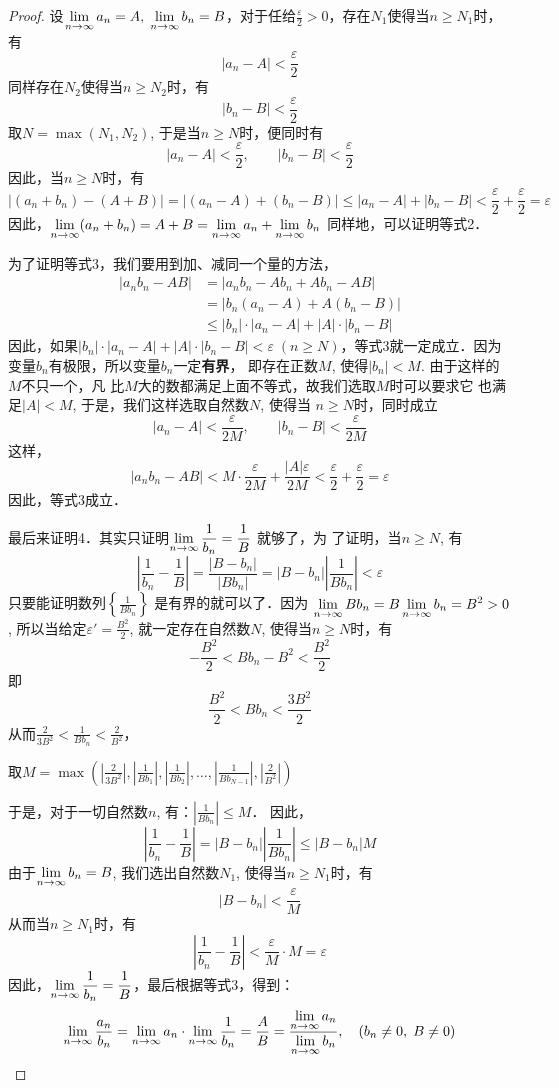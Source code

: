 \begin{proof}
    设$\displaystyle\lim_{n\to\infty}a_n=A,\; \displaystyle\lim_{n\to\infty}b_n=B$，对于任给$\frac{\varepsilon}{2}>0$，存在$N_1$使得当$n\ge N_1$时，有
\[|a_n-A|<\frac{\varepsilon}{2}\]
    同样存在$N_2$使得当$n\ge N_2$时，有
    \[|b_n-B|<\frac{\varepsilon}{2}\]
    取$N=\max(N_1,N_2)$, 于是当$n\ge N$时，便同时有
\[|a_n-A|<\frac{\varepsilon}{2},\qquad |b_n-B|<\frac{\varepsilon}{2}\]
    因此，当$n\ge N$时，有
\[|(a_n+b_n)-(A+B)|=|(a_n-A)+(b_n-B)|\le |a_n-A|+|b_n-B|<\frac{\varepsilon}{2}+\frac{\varepsilon}{2}=\varepsilon\]
因此，$\displaystyle\lim_{n\to\infty}(a_n+b_n)=A+B=\displaystyle\lim_{n\to\infty}a_n+\displaystyle\lim_{n\to\infty}b_n$
同样地，可以证明等式2．

为了证明等式3，我们要用到加、减同一个量的方法，
\[\begin{split}
    |a_nb_n - AB| &= |a_nb_n - Ab_n + Ab_n -AB|\\
&=|b_n(a_n-A)+A(b_n-B)|\\
&\le |b_n|\cdot |a_n-A|+|A|\cdot |b_n-B|
\end{split}\]
因此，如果$|b_n|\cdot |a_n-A|+|A|\cdot |b_n-B|<\varepsilon\; (n\ge N)$，等式3就一定成立．因为变量$b_n$有极限，所以变量$b_n$一定\textbf{有界}，
即存在正数$M$, 使得$|b_n|<M$. 由于这样的$M$不只一个，凡
比$M$大的数都满足上面不等式，故我们选取$M$时可以要求它
也满足$|A|<M$, 于是，我们这样选取自然数$N$, 使得当
$n\ge N$时，同时成立
\[|a_n-A|<\frac{\varepsilon}{2M},\qquad |b_n-B|<\frac{\varepsilon}{2M}\]
这样，
\[|a_nb_n-AB|<M\cdot \frac{\varepsilon}{2M}+\frac{|A|\varepsilon}{2M}<\frac{\varepsilon}{2}+\frac{\varepsilon}{2}=\varepsilon\]
因此，等式3成立．

最后来证明4．其实只证明$\displaystyle\lim_{n\to\infty}\dfrac{1}{b_n}=\dfrac{1}{B}$
就够了，为
了证明，当$n\ge N$, 有
\[\left|\frac{1}{b_n}-\frac{1}{B}\right|=\frac{|B-b_n|}{|Bb_n|}=|B-b_n|\left|\frac{1}{Bb_n}\right|<\varepsilon\]
只要能证明数列$\left\{\frac{1}{Bb_n}\right\}$
是有界的就可以了．因为
$\displaystyle\lim_{n\to\infty}Bb_n=B\displaystyle\lim_{n\to\infty}b_n=B^2>0$, 所以当给定$\varepsilon'=\frac{B^2}{2}$, 
就一定存在自然数$N$, 使得当$n\ge N$时，有
\[-\frac{B^2}{2}<Bb_n-B^2<\frac{B^2}{2}\]
即
\[\frac{B^2}{2}<Bb_n<\frac{3B^2}{2}\]
从而$\frac{2}{3B^2}<\frac{1}{Bb_n}<\frac{2}{B^2}$，

取$M=\max\left(\left|\frac{2}{3B^2}\right|, \left|\frac{1}{Bb_1}\right|, \left|\frac{1}{Bb_2}\right|, \ldots, \left|\frac{1}{Bb_{N-1}}\right|,\left|\frac{2}{B^2}\right|\right)$

于是，对于一切自然数$n$, 有：$\left|\frac{1}{Bb_n}\right|\le M$．
因此，
\[\left|\frac{1}{b_n}-\frac{1}{B}\right|=|B-b_n|\left|\frac{1}{Bb_n}\right|\le |B-b_n|M\]
由于$\displaystyle\lim_{n\to\infty}b_n=B$, 我们选出自然数$N_1$, 使得当$n\ge N_1$时，有
\[|B-b_n|<\frac{\varepsilon}{M}\]
从而当$n\ge N_1$时，有
\[\left|\frac{1}{b_n}-\frac{1}{B}\right|<\frac{\varepsilon}{M}\cdot M=\varepsilon\]
因此，$\displaystyle\lim_{n\to\infty}\dfrac{1}{b_n}=\dfrac{1}{B}$，最后根据等式3，得到：
\[\displaystyle\lim_{n\to\infty}\dfrac{a_n}{b_n}=\displaystyle\lim_{n\to\infty}a_n\cdot \displaystyle\lim_{n\to\infty}\dfrac{1}{b_n}=\dfrac{A}{B}=\dfrac{\displaystyle\lim_{n\to\infty}a_n}{\displaystyle\lim_{n\to\infty}b_n},\quad (b_n\ne 0,\; B\ne 0)\]
\end{proof}

